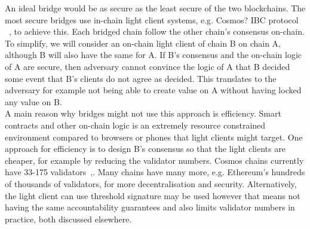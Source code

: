 \noindent An ideal bridge would be as secure as the least secure of the two blockchains. The most secure bridges use in-chain light client systems, e.g. Cosmos? IBC protocol ~\cite{IBC_paper}, to achieve this. Each bridged chain follow the other chain's consensus on-chain. To simplify, we will consider an on-chain light client of chain B on chain A, although B will also have the same for A. If B's consensus and the on-chain logic of A are secure, then adversary cannot convince the logic of A that B decided some event that B's clients do not agree as decided. This translates to the adversary for example not being able to create value on A without having locked any value on B. \\

\noindent A main reason why bridges might not use this approach is efficiency. Smart contracts and other on-chain logic is an extremely resource constrained environment compared to browsers or phones that light clients might target. One approach for efficiency is to design B's consensus so that the light clients are cheaper, for example by reducing the validator numbers. Cosmos chains currently have 33-175 validators~\cite{CosmosValNYX},\cite{CosmosValHUB}. Many chains have many more, e.g. Ethereum's hundreds of thousands of validators, for more decentralisation and security. Alternatively, the light client can use threshold signature may be used however that means not having the same accountability guarantees and also limits validator numbers in practice, both discussed elsewhere. \\


